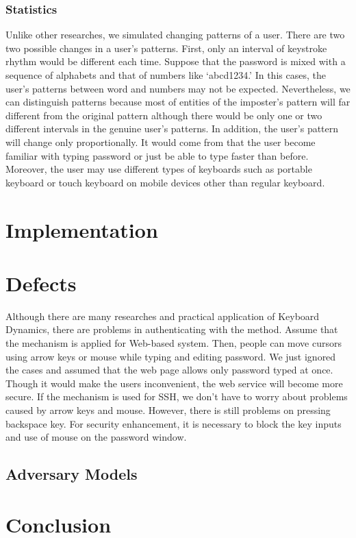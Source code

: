 \documentclass[twocolumn,showpacs,%
  nofootinbib,aps,%
  eqsecnum,prd,notitlepage,showkeys,10pt]{revtex4-1}
\begin{document}
\subsubsection{Statistics}
Unlike other researches, we simulated changing patterns of a user. There are two two possible changes in a user's patterns. First, only an interval of keystroke rhythm would be different each time. Suppose that the password is mixed with a sequence of alphabets and that of numbers like `abcd1234.' In this cases, the user's patterns between word and numbers may not be expected. Nevertheless, we can distinguish patterns because most of entities of the imposter's pattern will far different from the original pattern although there would be only one or two different intervals in the genuine user's patterns. In addition, the user's pattern will change only proportionally. It would come from that the user become familiar with typing password or just be able to type faster than before. Moreover, the user may use different types of keyboards such as portable keyboard or touch keyboard on mobile devices other than regular keyboard.

\section{Implementation}

\section{Defects}
Although there are many researches and practical application of Keyboard Dynamics, there are problems in authenticating with the method. Assume that the mechanism is applied for Web-based system. Then, people can move cursors using arrow keys or mouse while typing and editing password. We just ignored the cases and assumed that the web page allows only password typed at once. Though it would make the users inconvenient, the web service will become more secure. If the mechanism is used for SSH, we don't have to worry about problems caused by arrow keys and mouse. However, there is still problems on pressing backspace key. For security enhancement, it is necessary to block the key inputs and use of mouse on the password window.


\subsection{Adversary Models}


\section{Conclusion}

\newpage


\end{document}
